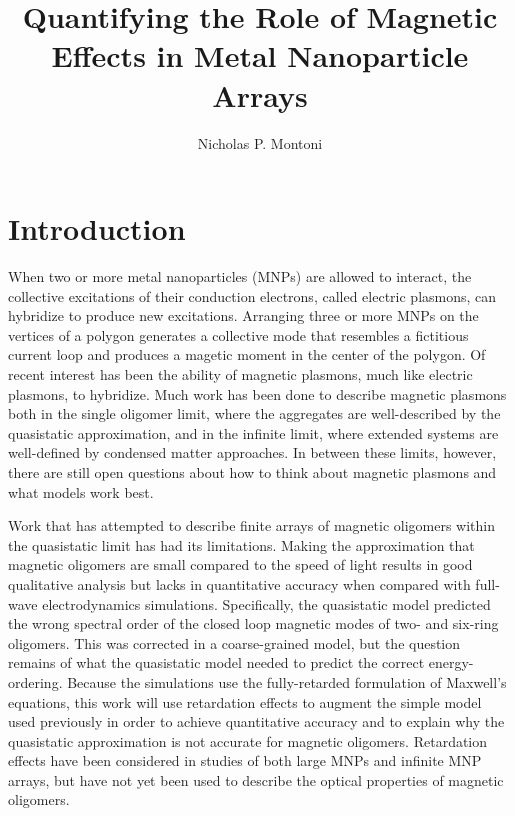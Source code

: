 \documentclass[12pt, letterpaper, twoside]{report}
\title{Quantifying the Role of Magnetic Effects in Metal Nanoparticle Arrays}
\author{Nicholas P. Montoni}
\date{\center{Wednesday, August 16, 2017\\Chemistry Building 339, 9:30 AM}}
\begin{document}
\begin{titlepage}
\maketitle
\end{titlepage}

\section*{Introduction}
When two or more metal nanoparticles (MNPs) are allowed to interact, the collective excitations of their conduction electrons, called electric plasmons, can hybridize to produce new excitations\cite{Lucas1976,ARAVIND1981,Xu1995,Mischenko1995}. Arranging three or more MNPs on the vertices of a polygon generates a collective mode that resembles a fictitious current loop and produces a magetic moment in the center of the polygon\cite{Alu2006,Alu2008,Liu2011,Nord2006,Cherqui2014}. Of recent interest has been the ability of magnetic plasmons, much like electric plasmons, to hybridize\cite{Cherqui2016}. Much work has been done to describe magnetic plasmons both in the single oligomer limit\cite{Dionne2016}, where the aggregates are well-described by the quasistatic approximation, and in the infinite limit, where extended systems are well-defined by condensed matter approaches\cite{Weick2013}. In between these limits, however, there are still open questions about how to think about magnetic plasmons and what models work best\cite{Engheta2017}. 

Work that has attempted to describe finite arrays of magnetic oligomers within the quasistatic limit has had its limitations\cite{Cherqui2014}. Making the approximation that magnetic oligomers are small compared to the speed of light results in good qualitative analysis but lacks in quantitative accuracy when compared with full-wave electrodynamics simulations. Specifically, the quasistatic model predicted the wrong spectral order of the closed loop magnetic modes of two- and six-ring oligomers. This was corrected in a coarse-grained model, but the question remains of what the quasistatic model needed to predict the correct energy-ordering. Because the simulations use the fully-retarded formulation of Maxwell's equations, this work will use retardation effects to augment the simple model used previously in order to achieve quantitative accuracy and to explain why the quasistatic approximation is not accurate for magnetic oligomers. Retardation effects have been considered in studies of both large MNPs and infinite MNP arrays\cite{Abajo2008,Gu2010,vonPlessen2007,Rechbacher2003,Kottman2001,Schatz2003,Royer2005,Chumanov2010}, but have not yet been used to describe the optical properties of magnetic oligomers.
\end{document}
